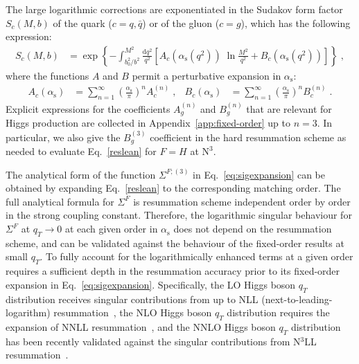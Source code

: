 \documentclass[12pt]{article}
\DeclareRobustCommand{\alphas}{\ensuremath{\alpha_{\mathrm{s}}}\xspace}
\DeclareRobustCommand{\as}{\alphas}
\DeclareRobustCommand{\asOpi}{\ensuremath{\left(\frac{\as}{\pi}\right)}} %
\DeclareRobustCommand{\qt}{\ensuremath{q_T}\xspace}
\DeclareRobustCommand{\rd}{\ensuremath{\mathrm{d}}}
\DeclareRobustCommand{\LO}{\text{LO}\xspace}
\DeclareRobustCommand{\N}[1]{\ensuremath{\text{N}^{#1}}} %
\begin{document}
The large logarithmic corrections are exponentiated in the Sudakov form factor $S_c(M,b)$ of the quark  ($c=q, {\bar q}$) or of the gluon ($c=g$), which has the following  expression:
\begin{align}
  S_c(M,b) &= 
  \exp \left\{ - \int_{b_0^2/b^2}^{M^2} \frac{\rd q^2}{q^2} 
  \left[ A_c(\as(q^2)) \;\ln \frac{M^2}{q^2} + B_c(\as(q^2)) \right] \right\} 
  \;,
  \label{formfact}
\end{align}
where the functions $A$ and $B$ permit a perturbative expansion in $\as$:
\begin{align}
  A_c(\as) &= 
  \sum_{n=1}^\infty \asOpi^n A_c^{(n)} \;,
  &
  B_c(\as) &= 
  \sum_{n=1}^\infty \asOpi^n B_c^{(n)} \;.
  \label{eq:abexp}
\end{align}
Explicit expressions for the coefficients $A_g^{(n)}$ and $B_g^{(n)}$ that are relevant for Higgs production are collected in Appendix~\ref{app:fixed-order} up to $n=3$.
In particular, we also give the $B_g^{(3)}$ coefficient in the hard resummation scheme as needed to evaluate Eq.~\eqref{reslean} for $F=H$ at \N3\LO.

The analytical form of the function $\Sigma^{F;(3)}$ in Eq.~\eqref{eq:sigexpansion} can be obtained by expanding Eq.~\eqref{reslean} to the corresponding matching order. The full analytical formula for $\Sigma^{F}$ is resummation scheme independent order by order in the strong coupling constant. Therefore, the logarithmic singular behaviour for $\Sigma^{F}$ at $\qt\rightarrow 0$ at 
each given order in $\as$ does not depend on the 
resummation scheme, and can be validated against the behaviour of the fixed-order results at small $\qt$. To fully 
account for the logarithmically enhanced terms at a given order requires a sufficient depth in the resummation accuracy prior to 
its fixed-order expansion in Eq.~\eqref{eq:sigexpansion}. Specifically, the LO Higgs boson $\qt$ distribution receives singular contributions from up to NLL (next-to-leading-logarithm) resummation~\cite{Catani:1988vd,Kauffman:1991cx}, the NLO Higgs boson $\qt$ distribution requires the expansion of NNLL resummation~\cite{deFlorian:2001zd,deFlorian:2000pr,Becher:2012yn,Neill:2015roa}, and the NNLO Higgs boson $\qt$ distribution has been recently validated against the singular contributions from N$^3$LL resummation~\cite{Chen:2018pzu,Bizon:2018foh}. 
\end{document}
